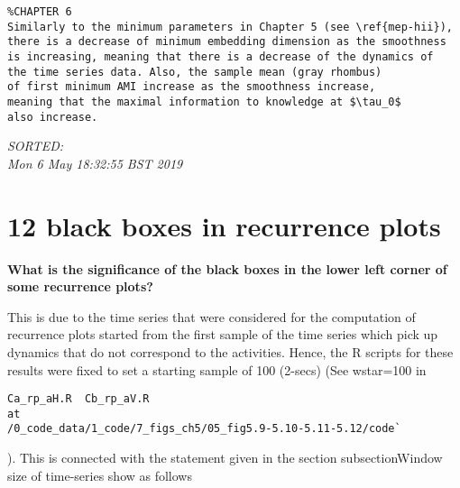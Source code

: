 \documentclass[12pt]{article}
\begin{document}
\begin{enumerate}
\begin{verbatim}
%CHAPTER 6
Similarly to the minimum parameters in Chapter 5 (see \ref{mep-hii}),
there is a decrease of minimum embedding dimension as the smoothness 
is increasing, meaning that there is a decrease of the dynamics of 
the time series data. Also, the sample mean (gray rhombus) 
of first minimum AMI increase as the smoothness increase,
meaning that the maximal information to knowledge at $\tau_0$ 
also increase.

	\end{verbatim}
	\textit{
	SORTED:  \\
	Mon  6 May 18:32:55 BST 2019
	}
	\\














\end{enumerate}




%
%
%
%


\section*{12 black boxes in recurrence plots}
\textbf{
What is the significance of the black boxes 
in the lower left corner of some recurrence plots?
}


This is due to the time series that were considered for the 
computation of recurrence plots started from the first sample of the
time series which pick up dynamics that do not correspond to 
the activities. Hence, the R scripts for these results were fixed to set a 
starting sample of 100 (2-secs)
(See wstar=100 in 
\begin{verbatim}
Ca_rp_aH.R  Cb_rp_aV.R
at
/0_code_data/1_code/7_figs_ch5/05_fig5.9-5.10-5.11-5.12/code`
\end{verbatim}).
This is connected with the statement given in the
section subsection{Window size of time-series} show as follows
\end{document}
